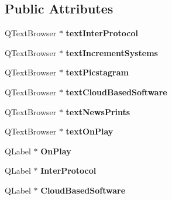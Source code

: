 \subsection*{Public Attributes}
\begin{DoxyCompactItemize}
\item 
\mbox{\label{class_ui___testimonials_a6a8510aa73ee31fdcd18e098deea983e}} 
Q\+Text\+Browser $\ast$ {\bfseries text\+Inter\+Protocol}
\item 
\mbox{\label{class_ui___testimonials_a0d9afd0e2c5c24e1e9bfa4fdf2700b8b}} 
Q\+Text\+Browser $\ast$ {\bfseries text\+Increment\+Systems}
\item 
\mbox{\label{class_ui___testimonials_ad3a83293eb0c1f2e53b0a3e7ddc612e0}} 
Q\+Text\+Browser $\ast$ {\bfseries text\+Picstagram}
\item 
\mbox{\label{class_ui___testimonials_a9ad43e8c04d09af9f37d85c278fba6c8}} 
Q\+Text\+Browser $\ast$ {\bfseries text\+Cloud\+Based\+Software}
\item 
\mbox{\label{class_ui___testimonials_a09e34c99fd34c2c9ff2177295fcbead7}} 
Q\+Text\+Browser $\ast$ {\bfseries text\+News\+Prints}
\item 
\mbox{\label{class_ui___testimonials_a2238641b22301829a2ee62915353a226}} 
Q\+Text\+Browser $\ast$ {\bfseries text\+On\+Play}
\item 
\mbox{\label{class_ui___testimonials_ae77badabbf08c2897ac3c556fa7788ad}} 
Q\+Label $\ast$ {\bfseries On\+Play}
\item 
\mbox{\label{class_ui___testimonials_a12ccdd81c7703cd9cc6970665895f016}} 
Q\+Label $\ast$ {\bfseries Inter\+Protocol}
\item 
\mbox{\label{class_ui___testimonials_a6f8774aa4b8e2e54e924cf40644e65ef}} 
Q\+Label $\ast$ {\bfseries Cloud\+Based\+Software}
\item 
\mbox{\label{class_ui___testimonials_ae0a9f12226b6ecf914580b4e2ffbd6a2}} 

\end{DoxyCompactItemize}
